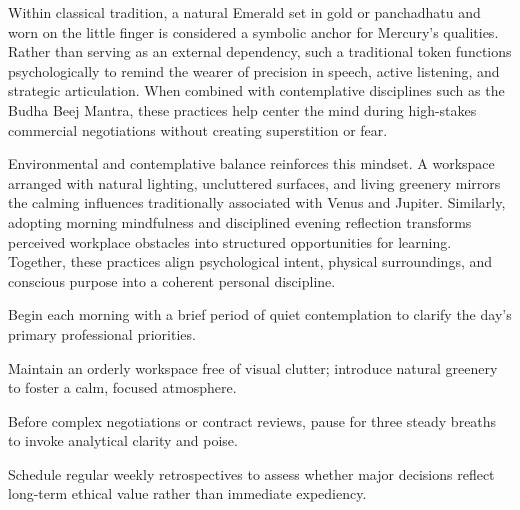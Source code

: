 {\fontsize{9}{13}\selectfont Within classical tradition, a natural Emerald set in gold or panchadhatu and worn on the little finger is considered a symbolic anchor for Mercury's qualities. Rather than serving as an external dependency, such a traditional token functions psychologically to remind the wearer of precision in speech, active listening, and strategic articulation. When combined with contemplative disciplines such as the Budha Beej Mantra, these practices help center the mind during high-stakes commercial negotiations without creating superstition or fear.}\par\vspace{1.8mm}

{\fontsize{9}{13}\selectfont Environmental and contemplative balance reinforces this mindset. A workspace arranged with natural lighting, uncluttered surfaces, and living greenery mirrors the calming influences traditionally associated with Venus and Jupiter. Similarly, adopting morning mindfulness and disciplined evening reflection transforms perceived workplace obstacles into structured opportunities for learning. Together, these practices align psychological intent, physical surroundings, and conscious purpose into a coherent personal discipline.}\par\vspace{1.8mm}

\begin{diamondlist}
  \item {\fontsize{8.5}{12}\selectfont Begin each morning with a brief period of quiet contemplation to clarify the day's primary professional priorities.}
  \item {\fontsize{8.5}{12}\selectfont Maintain an orderly workspace free of visual clutter; introduce natural greenery to foster a calm, focused atmosphere.}
  \item {\fontsize{8.5}{12}\selectfont Before complex negotiations or contract reviews, pause for three steady breaths to invoke analytical clarity and poise.}
  \item {\fontsize{8.5}{12}\selectfont Schedule regular weekly retrospectives to assess whether major decisions reflect long-term ethical value rather than immediate expediency.}
\end{diamondlist}


